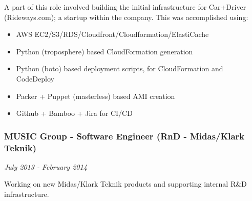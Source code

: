 A part of this role involved building the initial infrastructure for
Car+Driver (Rideways.com); a startup within the company. This was
accomplished using:

\begin{itemize}
\itemsep1pt\parskip0pt
\item
  AWS EC2/S3/RDS/Cloudfront/Cloudformation/ElastiCache
\item
  Python (troposphere) based CloudFormation generation
\item
  Python (boto) based deployment scripts, for CloudFormation and
  CodeDeploy
\item
  Packer + Puppet (masterless) based AMI creation
\item
  Github + Bamboo + Jira for CI/CD
\end{itemize}

\subsubsection{MUSIC Group - Software Engineer (RnD - Midas/Klark
Teknik)}\label{music-group---software-engineer-rnd---midasklark-teknik}

\emph{July 2013 - February 2014}

Working on new Midas/Klark Teknik products and supporting internal R\&D
infrastructure.

